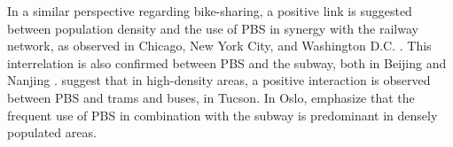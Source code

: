 \begin{refsegment}
In a similar perspective regarding bike-sharing, a positive link is suggested between population density and the use of \acrshort{PBS} in synergy with the railway network, as observed in Chicago, New York City, and Washington D.C. \textcolor{blue}{\autocite[16]{kong_deciphering_2020}}. This interrelation is also confirmed between \acrshort{PBS} and the subway, both in Beijing \textcolor{blue}{\autocite[9]{yu_understanding_2021}} and Nanjing \textcolor{blue}{\autocite[12]{chen_what_2022}}. \textcolor{blue}{\textcite[15]{li_investigating_2022}} suggest that in high-density areas, a positive interaction is observed between \acrshort{PBS} and trams and buses, in Tucson. In Oslo, \textcolor{blue}{\textcite[399]{bocker_bike_2020}} emphasize that the frequent use of \acrshort{PBS} in combination with the subway is predominant in densely populated areas.%


\end{refsegment}
